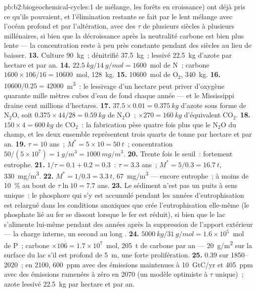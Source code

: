 \begin{solution}{pb:b2:biogeochemical-cycles:1}
de mélange, les forêts en croissance) ont déjà pris ce qu'ils pouvaient,
et l'élimination restante se fait par le lent mélange avec l'océan
profond et par l'altération, avec des $\tau$ de plusieurs siècles à
plusieurs millénaires, si bien que la décroissance après la neutralité
carbone est bien plus lente --- la concentration reste à peu près
constante pendant des siècles au lieu de baisser.
\textbf{13.} Culture \qty{90}{kg}~; dénitrifié \qty{37.5}{kg}~; lessivé
\qty{22.5}{kg} d'azote par hectare et par an.
\textbf{14.} $\qty{22.5}{kg}/\qty{14}{g/mol} = 1600$~mol de N~; carbone
$1600\times 106/16 = \num{10600}$~mol, \qty{128}{kg}.
\textbf{15.} \num{10600}~mol de $\mathrm{O_2}$, \qty{340}{kg}.
\textbf{16.} $\num{10600}/0.25 = \num{42000}$~\unit{m^3}~: le lessivage
d'un hectare peut priver d'oxygène quarante mille mètres cubes d'eau de
fond chaque année --- et le Mississippi draine cent millions d'hectares.
\textbf{17.} $37.5\times 0.01 = \qty{0.375}{kg}$ d'azote sous forme de
$\mathrm{N_2O}$, soit $0.375\times 44/28 = \qty{0.59}{kg}$ de $\mathrm{N_2O}$~;
$\times 270 = \qty{160}{kg}$ d'équivalent $\mathrm{CO_2}$.
\textbf{18.} $150\times 4 = \qty{600}{kg}$ de $\mathrm{CO_2}$~: la
fabrication pèse quatre fois plus que le $\mathrm{N_2O}$ du champ, et les
deux ensemble représentent trois quarts de tonne par hectare et par an.
\textbf{19.} $\tau = 10$ ans~; $M^{*} = 5\times 10 = \qty{50}{t}$~;
concentration $50/(5\times 10^{7}) = \qty{1}{g/m^3} =
\qty{1000}{mg/m^3}$.
\textbf{20.} Trente fois le seuil~: fortement eutrophe.
\textbf{21.} $1/\tau = 0.1 + 0.2 = 0.3$~: $\tau = 3.3$ ans~; $M^{*} =
5/0.3 = \qty{16.7}{t}$, \qty{330}{mg/m^3}.
\textbf{22.} $M^{*} = 1/0.3 = \qty{3.3}{t}$, \qty{67}{mg/m^3} --- encore
eutrophe~; à moins de \qty{10}{\%} au bout de $\tau\ln 10 = 7.7$ ans.
\textbf{23.} Le sédiment n'est pas un puits à sens unique~: le phosphore
qui s'y est accumulé pendant les années d'eutrophisation est relargué
dans les conditions anoxiques que crée l'eutrophisation elle-même (le
phosphate lié au fer se dissout lorsque le fer est réduit), si bien que
le lac s'alimente lui-même pendant des années après la suppression de
l'apport extérieur --- la charge interne, un second  au long
.
\textbf{24.} $\qty{5000}{kg}/\qty{31}{g/mol} = 1.6\times 10^{5}$~mol de P~;
carbone $\times 106 = 1.7\times 10^{7}$~mol, \qty{205}{t} de carbone par
an --- \qty{20}{g/m^2} sur la surface du lac s'il est profond de
\qty{5}{m}, une forte prolifération.
\textbf{25.}  $0.39$ sur 1850--2020~; en 2100,
\qty{600}{ppm} avec des émissions maintenues à \qty{10}{GtC/yr} et
\qty{405}{ppm} avec des émissions ramenées à zéro en 2070 (un modèle
optimiste à $\tau$ unique)~; azote lessivé \qty{22.5}{kg} par hectare
et par an.
\end{solution}
